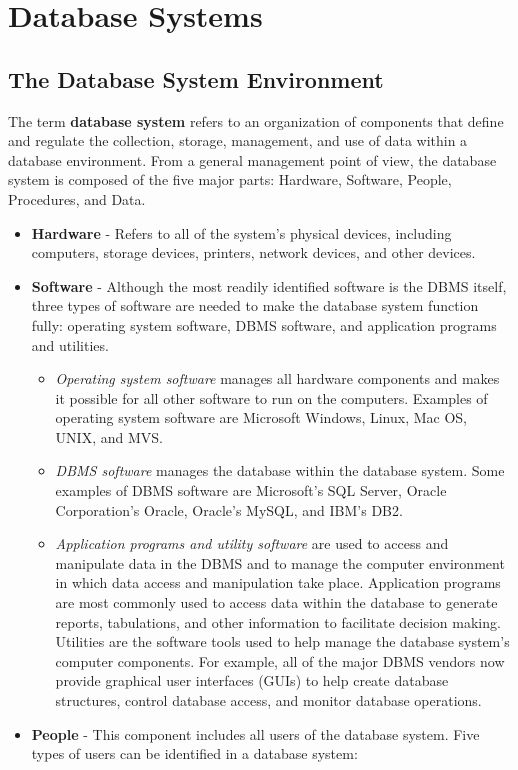 \documentclass[a4paper, 12pt, titlepage]{report}
\begin{document}
\section{Database Systems}
\subsection{The Database System Environment}
The term \textbf{database system} refers to an organization of components that define and regulate the collection, storage, management, and use of data within a database environment. From a general management point of view, the database system is composed of the five major parts: Hardware, Software, People, Procedures, and Data.
\begin{itemize}
\item \textbf{Hardware} - Refers to all of the system’s physical devices, including computers, storage devices, printers, network devices, and other devices.
\item \textbf{Software} - Although the most readily identified software is the DBMS itself, three types of software are needed to make the database system function fully: operating
system software, DBMS software, and application programs and utilities.
\begin{itemize}
\item \emph{Operating system software} manages all hardware components and makes it possible for all other software to run on the computers. Examples of operating system software are Microsoft Windows, Linux, Mac OS, UNIX, and MVS.
\item \emph{DBMS software} manages the database within the database system. Some examples of DBMS software are Microsoft’s SQL Server, Oracle Corporation’s Oracle, Oracle’s MySQL, and IBM’s DB2.
\item \emph{Application programs and utility software} are used to access and manipulate data in the DBMS and to manage the computer environment in which data access and manipulation take place. Application programs are most commonly used to access data within the database to generate reports, tabulations, and other information to facilitate decision making. Utilities are the software tools used to help manage the database system’s computer components. For example, all of the major DBMS vendors now provide graphical user interfaces (GUIs) to help create database structures, control database access, and monitor database operations.
\end{itemize}
\item \textbf{People} - This component includes all users of the database system. Five types of users can be identified in a database system:

\end{itemize}
\end{document}
